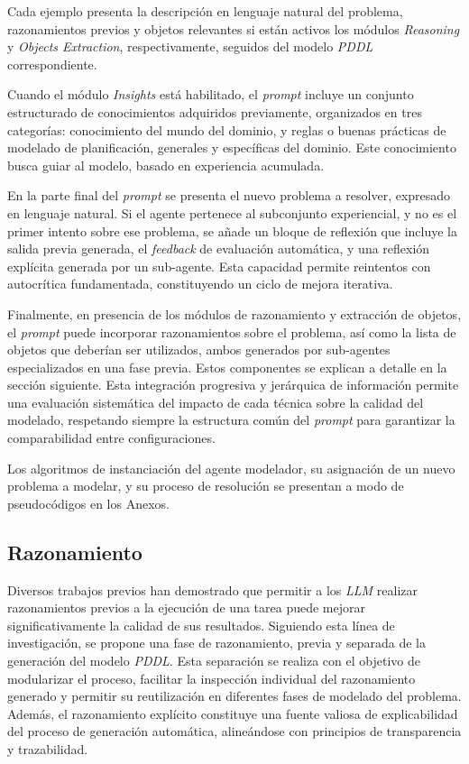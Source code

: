 Cada ejemplo presenta la descripción en lenguaje natural del problema, razonamientos previos y objetos relevantes si están activos los módulos \textit{Reasoning} y \textit{Objects Extraction}, respectivamente, seguidos del modelo \textit{PDDL} correspondiente.

Cuando el módulo \textit{Insights} está habilitado, el \textit{prompt} incluye un conjunto estructurado de conocimientos adquiridos previamente, organizados en tres categorías: conocimiento del mundo del dominio, y reglas o buenas prácticas de modelado de planificación, generales y específicas del dominio. Este conocimiento busca guiar al modelo, basado en experiencia acumulada.

En la parte final del \textit{prompt} se presenta el nuevo problema a resolver, expresado en lenguaje natural. Si el agente pertenece al subconjunto experiencial, y no es el primer intento sobre ese problema, se añade un bloque de reflexión que incluye la salida previa generada, el \textit{feedback} de evaluación automática, y una reflexión explícita generada por un sub-agente. Esta capacidad permite reintentos con autocrítica fundamentada, constituyendo un ciclo de mejora iterativa.

Finalmente, en presencia de los módulos de razonamiento y extracción de objetos, el \textit{prompt} puede incorporar razonamientos sobre el problema, así como la lista de objetos que deberían ser utilizados, ambos generados por sub-agentes especializados en una fase previa. Estos componentes se explican a detalle en la sección siguiente. Esta integración progresiva y jerárquica de información permite una evaluación sistemática del impacto de cada técnica sobre la calidad del modelado, respetando siempre la estructura común del \textit{prompt} para garantizar la comparabilidad entre configuraciones.

Los algoritmos de instanciación del agente modelador, su asignación de un nuevo problema a modelar, y su proceso de resolución se presentan a modo de pseudocódigos en los Anexos.

\subsection{Razonamiento}

Diversos trabajos previos han demostrado que permitir a los \textit{LLM} realizar razonamientos previos a la ejecución de una tarea puede mejorar significativamente la calidad de sus resultados. Siguiendo esta línea de investigación, se propone una fase de razonamiento, previa y separada de la generación del modelo \textit{PDDL}. Esta separación se realiza con el objetivo de modularizar el proceso, facilitar la inspección individual del razonamiento generado y permitir su reutilización en diferentes fases de modelado del problema. Además, el razonamiento explícito constituye una fuente valiosa de explicabilidad del proceso de generación automática, alineándose con principios de transparencia y trazabilidad.

